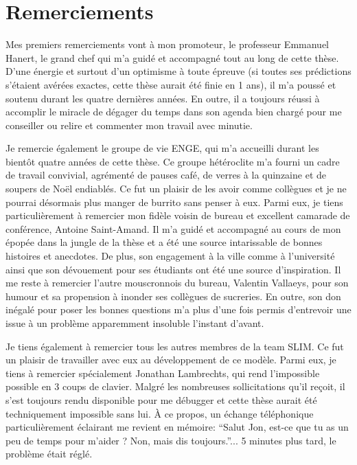  \phantom{thanks}
\chapter*{Remerciements}

Mes premiers remerciements vont à mon promoteur, le professeur Emmanuel Hanert, le grand chef qui m'a guidé et accompagné tout au long de cette thèse. D'une énergie et surtout d'un optimisme à toute épreuve (si toutes ses prédictions s'étaient avérées exactes, cette thèse aurait été finie en 1 ans), il m’a poussé et soutenu durant les quatre dernières années. En outre, il a toujours réussi à accomplir le miracle de dégager du temps dans son agenda bien chargé pour me conseiller ou relire et commenter mon travail avec minutie.

Je remercie également le groupe de vie ENGE, qui m'a accueilli durant les bientôt quatre années de cette thèse. Ce groupe hétéroclite m'a fourni un cadre de travail convivial, agrémenté de pauses café, de verres à la quinzaine et de soupers de Noël endiablés. Ce fut un plaisir de les avoir comme collègues et je ne pourrai désormais plus manger de burrito sans penser à eux. Parmi eux, je tiens particulièrement à remercier mon fidèle voisin de bureau et excellent camarade de conférence, Antoine Saint-Amand. Il m'a guidé et accompagné au cours de mon épopée dans la jungle de la thèse et a été une source intarissable de bonnes histoires et anecdotes. De plus, son engagement à la ville comme à l’université ainsi que son dévouement pour ses étudiants ont été une source d’inspiration. Il me reste à remercier l’autre mouscronnois du bureau, Valentin Vallaeys, pour son humour et sa propension à inonder ses collègues de sucreries. En outre, son don inégalé pour poser les bonnes questions m'a plus d'une fois permis d’entrevoir une issue à un problème apparemment insoluble l’instant d’avant.

Je tiens également à remercier tous les autres membres de la team SLIM. Ce fut un plaisir de travailler avec eux au développement de ce modèle. Parmi eux, je tiens à remercier spécialement Jonathan Lambrechts, qui rend l’impossible possible en 3 coups de clavier. Malgré les nombreuses sollicitations qu’il reçoit, il s'est toujours rendu disponible pour me débugger et cette thèse aurait été techniquement impossible sans lui. À ce propos, un échange téléphonique particulièrement éclairant me revient en mémoire: “Salut Jon, est-ce que tu as un peu de temps pour m’aider ? Non, mais dis toujours.”... 5 minutes plus tard, le problème était réglé.

